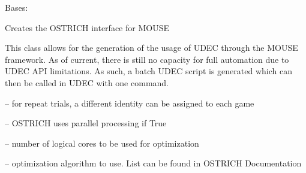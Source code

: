 \documentclass[letterpaper,10pt,english]{sphinxmanual}
\begin{document}
\begin{fulllineitems}
\label{\detokenize{MouseReferenceManual:Modules.Module_OSTRICH.Module_OSTRICH}}
Bases: {\hyperref[\detokenize{MouseReferenceManual:Modules.Base.ParameterEstimationModuleBaseClass}]{}}

Creates the OSTRICH interface for MOUSE

This class allows for the generation of the usage of UDEC through the MOUSE framework. As of current, there is still no capacity for full automation due to UDEC API limitations. As such, a batch UDEC script is generated which can then be called in UDEC with one command.

\begin{fulllineitems}
\label{\detokenize{MouseReferenceManual:Modules.Module_OSTRICH.Module_OSTRICH.identity}}
 -- for repeat trials, a different identity can be assigned to each game

\end{fulllineitems}


\begin{fulllineitems}
\label{\detokenize{MouseReferenceManual:Modules.Module_OSTRICH.Module_OSTRICH.MPI}}
 -- OSTRICH uses parallel processing if True

\end{fulllineitems}


\begin{fulllineitems}
\label{\detokenize{MouseReferenceManual:Modules.Module_OSTRICH.Module_OSTRICH.cores}}
 -- number of logical cores to be used for optimization

\end{fulllineitems}


\begin{fulllineitems}
\label{\detokenize{MouseReferenceManual:Modules.Module_OSTRICH.Module_OSTRICH.optimizer}}
 -- optimization algorithm to use. List can be found in OSTRICH Documentation


\end{fulllineitems}
\end{fulllineitems}
\end{document}
